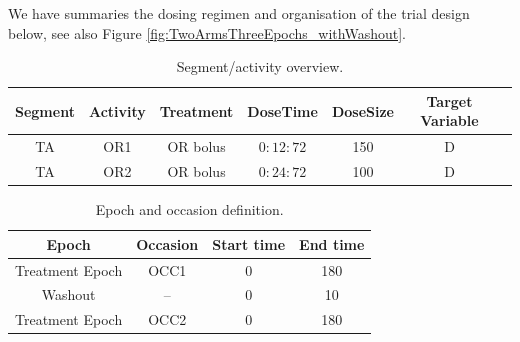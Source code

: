 We have summaries the dosing regimen and organisation of the trial
design below, see also Figure \ref{fig:TwoArmsThreeEpochs_withWashout}.

\begin{table}[htdp!]
\begin{center}
\begin{tabular}{ccccccc}
\hline
Segment&Activity & Treatment & DoseTime & DoseSize & Target Variable \\
\hline
TA& OR1 &  OR bolus & $0:12:72$ & 150 & D \\
TA& OR2 &  OR bolus & $0:24:72$ & 100 & D \\
\hline
\end{tabular}
\end{center}
\caption{Segment/activity overview.}
\label{fig:eg4:segmentCellArmEpoch}
\end{table}

\begin{table}[htdp!]
\begin{center}
\begin{tabular}{cccc}
\hline
Epoch & Occasion & Start time & End time \\
\hline
Treatment Epoch & OCC1 & 0 &  180  \\
Washout & -- & 0 &  10  \\
Treatment Epoch & OCC2 & 0 &  180  \\
\hline
\end{tabular}
\end{center}
\caption{Epoch and occasion definition.}
\label{fig:eg4:epochDef}
\end{table}


